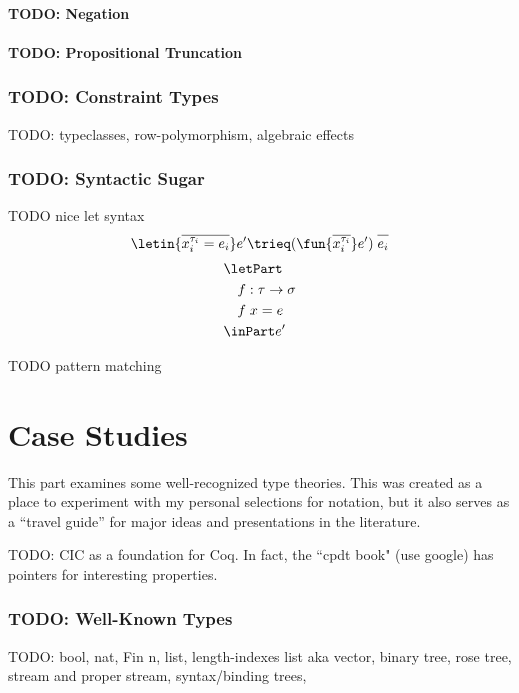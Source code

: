\documentclass[11pt]{article} %
\theoremstyle{definition}
\theoremstyle{remark}
\begin{document}
\subsection{TODO: Negation}
\subsection{TODO: Propositional Truncation}

\section{TODO: Constraint Types}

TODO: typeclasses, row-polymorphism, algebraic effects

\section{TODO: Syntactic Sugar}

TODO nice let syntax
$$\letin{\overline{x_i^{\tau_i} = e_i}}e' \trieq (\fun{\overline{x_i^{\tau_i}}}e')\;\overline{\mathstrut e_i}$$
\begin{align*}
& \letPart \\
& \quad f : \tau \to \sigma \\
& \quad f\;x = e \\
& \inPart e'
\end{align*}

TODO pattern matching

\part{Case Studies}

This part examines some well-recognized type theories.
This was created as a place to experiment with my personal selections for notation, but it also serves as a ``travel guide'' for major ideas and presentations in the literature.

TODO: CIC as a foundation for Coq. In fact, the ``cpdt book" (use google) has pointers for interesting properties.

\section{TODO: Well-Known Types}

TODO: bool, nat, Fin n, list, length-indexes list aka vector, binary tree, rose tree, stream and proper stream, syntax/binding trees, 
\end{document}
